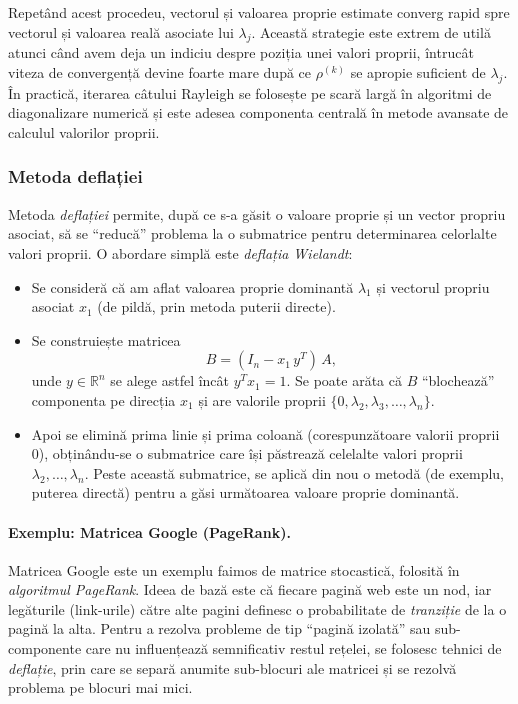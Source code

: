 \documentclass{exam}
\begin{document}
Repetând acest procedeu, vectorul și valoarea proprie estimate converg rapid spre vectorul și valoarea reală asociate lui $\lambda_j$. Această strategie este extrem de utilă atunci când avem deja un indiciu despre poziția unei valori proprii, întrucât viteza de convergență devine foarte mare după ce $\rho^{(k)}$ se apropie suficient de $\lambda_j$. În practică, iterarea câtului Rayleigh se folosește pe scară largă în algoritmi de diagonalizare numerică și este adesea componenta centrală în metode avansate de calculul valorilor proprii.


\subsubsection{Metoda deflației}

Metoda \emph{deflației} permite, după ce s-a găsit o valoare proprie și un vector propriu asociat, să se “reducă” problema la o submatrice pentru determinarea celorlalte valori proprii. O abordare simplă este \emph{deflația Wielandt}:

\begin{itemize}
	\item Se consideră că am aflat valoarea proprie dominantă $\lambda_1$ și vectorul propriu asociat $x_1$ (de pildă, prin metoda puterii directe).
	\item Se construiește matricea
	      \[
	      	B = (I_n - x_1\,y^T)\,A,
	      \]
	      unde $y \in \mathbb{R}^n$ se alege astfel încât $y^T x_1 = 1$. Se poate arăta că $B$ “blochează” componenta pe direcția $x_1$ și are valorile proprii
	      \(\{0, \lambda_2, \lambda_3, \dots,\lambda_n\}\).
	\item Apoi se elimină prima linie și prima coloană (corespunzătoare valorii proprii 0), obținându-se o submatrice care își păstrează celelalte valori proprii $\lambda_2,\ldots,\lambda_n$. Peste această submatrice, se aplică din nou o metodă (de exemplu, puterea directă) pentru a găsi următoarea valoare proprie dominantă.
\end{itemize}

\paragraph{Exemplu: Matricea Google (PageRank).}  
Matricea Google este un exemplu faimos de matrice stocastică, folosită în \emph{algoritmul PageRank}. Ideea de bază este că fiecare pagină web este un nod, iar legăturile (link-urile) către alte pagini definesc o probabilitate de \emph{tranziție} de la o pagină la alta. Pentru a rezolva probleme de tip “pagină izolată” sau sub-componente care nu influențează semnificativ restul rețelei, se folosesc tehnici de \emph{deflație}, prin care se separă anumite sub-blocuri ale matricei și se rezolvă problema pe blocuri mai mici.
\end{document}
